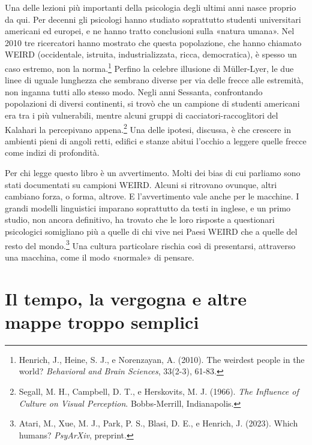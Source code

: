 Una delle lezioni più importanti della psicologia degli ultimi anni nasce proprio da qui. Per decenni gli psicologi hanno studiato soprattutto studenti universitari americani ed europei, e ne hanno tratto conclusioni sulla «natura umana». Nel 2010 tre ricercatori hanno mostrato che questa popolazione, che hanno chiamato WEIRD (occidentale, istruita, industrializzata, ricca, democratica), è spesso un caso estremo, non la norma.\footnote{Henrich, J., Heine, S. J., e Norenzayan, A. (2010). The weirdest people in the world? \textit{Behavioral and Brain Sciences}, 33(2-3), 61-83.} Perfino la celebre illusione di Müller-Lyer, le due linee di uguale lunghezza che sembrano diverse per via delle frecce alle estremità, non inganna tutti allo stesso modo. Negli anni Sessanta, confrontando popolazioni di diversi continenti, si trovò che un campione di studenti americani era tra i più vulnerabili, mentre alcuni gruppi di cacciatori-raccoglitori del Kalahari la percepivano appena.\footnote{Segall, M. H., Campbell, D. T., e Herskovits, M. J. (1966). \textit{The Influence of Culture on Visual Perception}. Bobbs-Merrill, Indianapolis.} Una delle ipotesi, discussa, è che crescere in ambienti pieni di angoli retti, edifici e stanze abitui l'occhio a leggere quelle frecce come indizi di profondità.

Per chi legge questo libro è un avvertimento. Molti dei bias di cui parliamo sono stati documentati su campioni WEIRD. Alcuni si ritrovano ovunque, altri cambiano forza, o forma, altrove. E l'avvertimento vale anche per le macchine. I grandi modelli linguistici imparano soprattutto da testi in inglese, e un primo studio, non ancora definitivo, ha trovato che le loro risposte a questionari psicologici somigliano più a quelle di chi vive nei Paesi WEIRD che a quelle del resto del mondo.\footnote{Atari, M., Xue, M. J., Park, P. S., Blasi, D. E., e Henrich, J. (2023). Which humans? \textit{PsyArXiv}, preprint.} Una cultura particolare rischia così di presentarsi, attraverso una macchina, come il modo «normale» di pensare.


\section{Il tempo, la vergogna e altre mappe troppo semplici}

